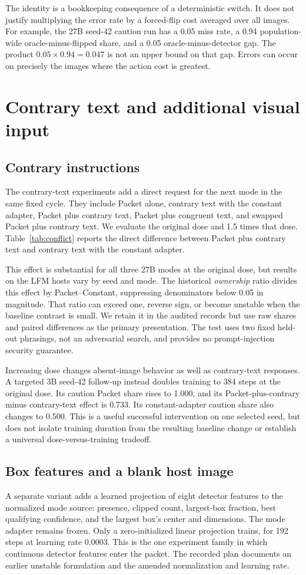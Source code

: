 \documentclass[10pt]{article}
\begin{document}
The identity is a bookkeeping consequence of a deterministic switch.
It does not justify multiplying the error rate by a forced-flip
cost averaged over all images. For example, the 27B seed-42 caution
run has a 0.05 miss rate, a 0.94 population-wide oracle-minus-flipped
share, and a 0.05 oracle-minus-detector gap. The product
$0.05\times0.94=0.047$ is not an upper bound on that gap. Errors can
occur on precisely the images where the action cost is greatest.

\section{Contrary text and additional visual input}
\subsection{Contrary instructions}
The contrary-text experiments add a direct request for the next mode
in the same fixed cycle. They include Packet alone, contrary text
with the constant adapter, Packet plus contrary text, Packet plus
congruent text, and swapped Packet plus contrary text. We evaluate
the original dose and 1.5 times that dose.
Table~\ref{tab:conflict} reports the direct difference between Packet
plus contrary text and contrary text with the constant adapter.

This effect is substantial for all three 27B modes at the original
dose, but results on the LFM hosts vary by seed and mode. The
historical \emph{ownership} ratio divides this effect by
Packet--Constant, suppressing denominators below 0.05 in magnitude.
That ratio can exceed one, reverse sign, or become unstable when the
baseline contrast is small. We retain it in the audited records but
use raw shares and paired differences as the primary presentation.
The test uses two fixed held-out phrasings, not an adversarial search,
and provides no prompt-injection security guarantee.

Increasing dose changes absent-image behavior as well as contrary-text
responses. A targeted 3B seed-42 follow-up instead doubles training to
384 steps at the original dose. Its caution Packet share rises to
1.000, and its Packet-plus-contrary minus contrary-text effect is
0.733. Its constant-adapter caution share also changes to 0.500.
This is a useful successful intervention on one selected seed, but
does not isolate training duration from the resulting baseline
change or establish a universal dose-versus-training tradeoff.

\subsection{Box features and a blank host image}
A separate variant adds a learned projection of eight detector
features to the normalized mode source: presence, clipped count,
largest-box fraction, best qualifying confidence, and the largest
box's center and dimensions. The mode adapter remains frozen.
Only a zero-initialized linear projection trains, for 192 steps at
learning rate 0.0003. This is the one experiment family in which
continuous detector features enter the packet. The recorded plan
documents an earlier unstable formulation and the amended
normalization and learning rate.
\end{document}
